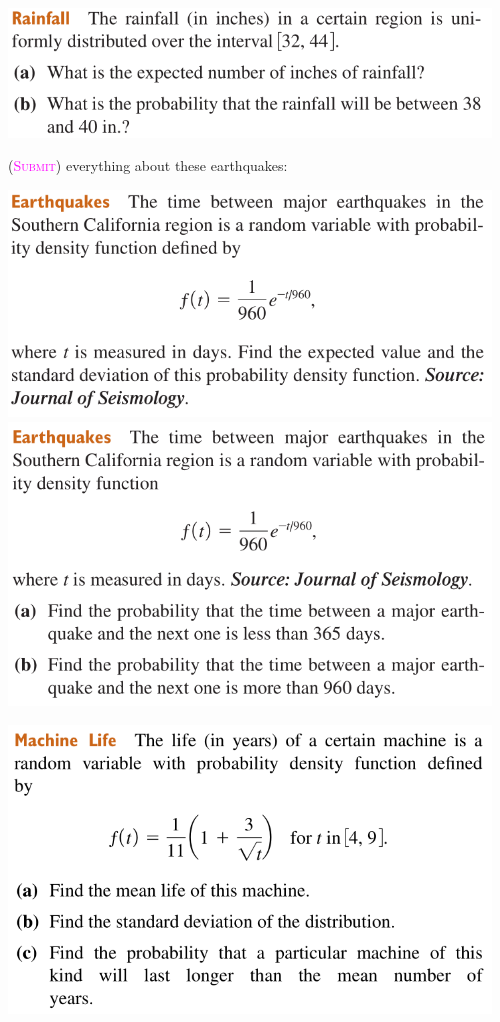 \begin{enumerate}
\begin{center}
            \includegraphics[width=0.96\textwidth]{screenshots/rainfall3.png}
        \end{center}
        \newpage
        (\textsc{\textcolor{magenta}{Submit}})
        everything about these earthquakes:
        \begin{center}
            \includegraphics[width=0.96\textwidth]{screenshots/earthquakes1.png}
            \includegraphics[width=0.96\textwidth]{screenshots/earthquakes2.png}
        \end{center}
        \newpage
        \begin{center}
            \includegraphics[width=0.96\textwidth]{screenshots/machine.png}

\end{center}
\end{enumerate}
